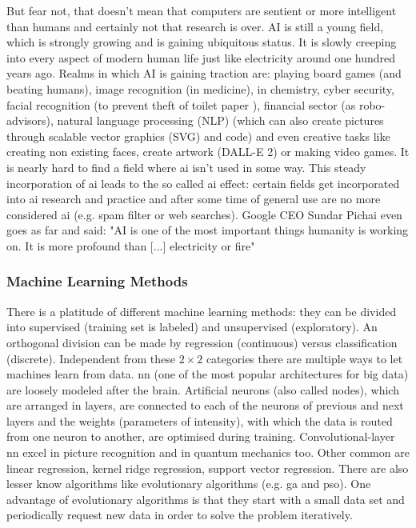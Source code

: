 But fear not, that doesn't mean that computers are sentient or more intelligent than humans\cite{searle1980,searle1999married} and certainly not that research is over. 
AI is still a young field, which is strongly growing and is gaining ubiquitous status. 
It is slowly creeping into every aspect of modern human life just like electricity around one hundred years ago. 
Realms in which AI is gaining traction are: 
%
playing board games (and beating humans)\cite{Silver2017,Feng1999,Campbell2002}, 
image recognition (in medicine)\cite{Li2020,Deo2015,Topol2019,Fujiyoshi2019}, 
in chemistry\cite{Westermayr2019,goh2017chemception,jha2018elemnet}, 
cyber security\cite{Sarker2021},
facial recognition (to prevent theft of toilet paper \cite{Andrews2017}),
financial sector (as robo-advisors)\cite{Littman2021},
natural language processing (NLP)\cite{Koroteev2021,Liu2021gpt,Parviainen2021} (which can also create pictures through scalable vector graphics (SVG) and code)
and even creative tasks like 
creating non existing faces\cite{Mansourifar2020}, 
create artwork (DALL-E 2)\cite{Marcus2022} or 
making video games\cite{Guzdial2016}.
%
It is nearly hard to find a field where \gls{ai} isn't used in some way. 
This steady incorporation of \gls{ai} leads to the so called \gls{ai} effect\cite{McCorduck1982,ai100}: 
certain fields get incorporated into \gls{ai} research and practice and after some time of general use are no more considered \gls{ai} (e.g. spam filter or web searches).
Google CEO Sundar Pichai even goes as far and said: 
"AI is one of the most important things humanity is working on. It is more profound than [...] electricity or fire"\cite{Hassan2020}

%
\subsubsection{Machine Learning Methods}
There is a platitude of different machine learning methods: 
they can be divided into supervised (training set is labeled) and unsupervised (exploratory).  
An orthogonal division can be made by regression (continuous) versus classification (discrete). 
Independent from these $2\times2$ categories there are multiple ways to let machines learn from data.
\Gls{nn} (one of the most popular architectures for big data\cite{Chiroma2019}) are loosely modeled after the brain\cite{bishop1994neural}.
%
Artificial neurons (also called nodes), which are arranged in layers, 
are connected to each of the neurons of previous and next layers
and the weights (parameters of intensity), with which the data is routed from one neuron to another, 
are optimised during training. 
%
Convolutional-layer \gls{nn} excel in picture recognition\cite{Lecun1995conv} and in quantum mechanics too\cite{westermayr2020combining}.
Other common  are linear regression, kernel ridge regression, support vector regression.
There are also lesser know algorithms like 
evolutionary algorithms (e.g. \gls{ga} and \gls{pso}).
%
One advantage of evolutionary algorithms is that they start with a small data set
and periodically request new data in order to solve the problem iteratively.

